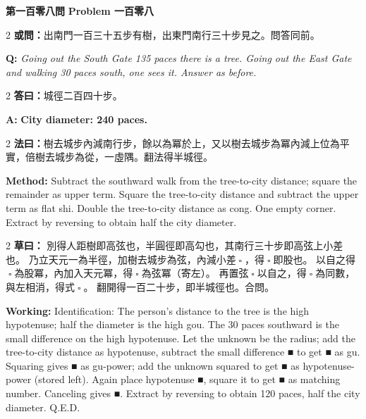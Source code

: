 \documentclass[11pt,a4paper]{article}
\let\origsquare\square
\renewcommand{\square}{\ensuremath{\origsquare}}%
\newcommand{\wen}[1]{%
  \par\vspace{0.5em}%
  \noindent\textcolor{problemcolor}{\textbf{第#1問}}%
  \hfill\textcolor{problemcolor}{\textbf{Problem #1}}\par\nopagebreak%
  \vspace{0.3em}%
}
\newcommand{\owen}[1]{%
  \noindent\textcolor{problemcolor}{\textbf{或問：}}{\tradfont #1}\par\nopagebreak%
}
\newcommand{\oweneng}[1]{%
  \noindent\textcolor{engcolor}{\textbf{Q: }}{\itshape #1}\par\nopagebreak%
}
\newcommand{\fayue}[1]{%
  \noindent\textcolor{methodcolor}{\textbf{法曰：}}{\tradfont #1}\par\nopagebreak%
}
\newcommand{\fayueeng}[1]{%
  \noindent\textcolor{engcolor}{\textbf{Method: }}{#1}\par\nopagebreak%
}
\newcommand{\tsaoyue}[1]{%
  \noindent\textcolor{workcolor}{\textbf{草曰：}}{\tradfont #1}\par%
}
\newcommand{\tsaoyueeng}[1]{%
  \noindent\textcolor{engcolor}{\textbf{Working: }}{\small #1}\par%
}
\newcommand{\dayue}[1]{%
  \noindent\textcolor{anscolor}{\textbf{答曰：}}{\tradfont #1}\par\nopagebreak%
}
\newcommand{\dayueeng}[1]{%
  \noindent\textcolor{engcolor}{\textbf{A: }}{\bfseries #1}\par\nopagebreak%
}
\begin{document}
\vspace{0.5cm}

\wen{一百零八}

\begin{paracol}{2}
\owen{出南門一百三十五步有樹，出東門南行三十步見之。問答同前。}
\switchcolumn
\oweneng{Going out the South Gate 135 paces there is a tree. Going out the East Gate and walking 30 paces south, one sees it. Answer as before.}
\end{paracol}

\begin{paracol}{2}
\dayue{城徑二百四十步。}
\switchcolumn
\dayueeng{City diameter: 240 paces.}
\end{paracol}

\begin{paracol}{2}
\fayue{樹去城步內減南行步，餘以為冪於上，又以樹去城步為冪內減上位為平實，倍樹去城步為從，一虛隅。翻法得半城徑。}
\switchcolumn
\fayueeng{Subtract the southward walk from the tree-to-city distance; square the remainder as upper term. Square the tree-to-city distance and subtract the upper term as flat shi. Double the tree-to-city distance as cong. One empty corner. Extract by reversing to obtain half the city diameter.}
\end{paracol}

\begin{paracol}{2}
\tsaoyue{%
別得人距樹即高弦也，半圓徑即高勾也，其南行三十步即高弦上小差也。
乃立天元一為半徑，加樹去城步為弦，內減小差$ \; \square \; $，得$ \; \square \; $即股也。
以自之得$ \; \square \; $為股冪，內加入天元冪，得$ \; \square \; $為弦冪（寄左）。
再置弦$ \; \square \; $以自之，得$ \; \square \; $為同數，與左相消，得式$ \; \square \; $。
翻開得一百二十步，即半城徑也。合問。}
\switchcolumn
\tsaoyueeng{%
Identification: The person's distance to the tree is the high hypotenuse; half the diameter is the high gou. The 30 paces southward is the small difference on the high hypotenuse. Let the unknown be the radius; add the tree-to-city distance as hypotenuse, subtract the small difference ■ to get ■ as gu. Squaring gives ■ as gu-power; add the unknown squared to get ■ as hypotenuse-power (stored left). Again place hypotenuse ■, square it to get ■ as matching number. Canceling gives ■. Extract by reversing to obtain 120 paces, half the city diameter. Q.E.D.}
\end{paracol}
\end{document}
